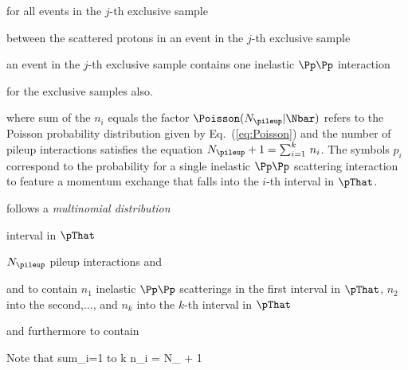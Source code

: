  for all events in the $j$-th exclusive sample

between the scattered protons in an event in the $j$-th exclusive sample

an event in the $j$-th exclusive sample contains one inelastic $\Pp\Pp$ interaction

 for the exclusive samples also.

where sum of the $n_{i}$ equals
the factor $\Poisson(N_{\pileup} \vert \Nbar)$ refers to the Poisson probability distribution given by Eq.~(\ref{eq:Poisson}) 
and the number of pileup interactions satisfies the equation $N_{\pileup} + 1 = \sum_{i=1}^{k} \, n_{i}$.
The symbols $p_{i}$ correspond to the probability for a single inelastic $\Pp\Pp$ scattering interaction to feature a momentum exchange that falls into the $i$-th interval in $\pThat$.

follows a {\em multinomial distribution}



interval in $\pThat$

$N_{\pileup}$ pileup interactions 
and 

and to contain $n_{1}$ inelastic $\Pp\Pp$ scatterings in the first interval in $\pThat$, $n_{2}$ into the second,$\dots$, and $n_{k}$ into the $k$-th interval in $\pThat$

and furthermore to contain


Note that sum_{i=1 to k} n_{i} = N_{\pileup} + 1
